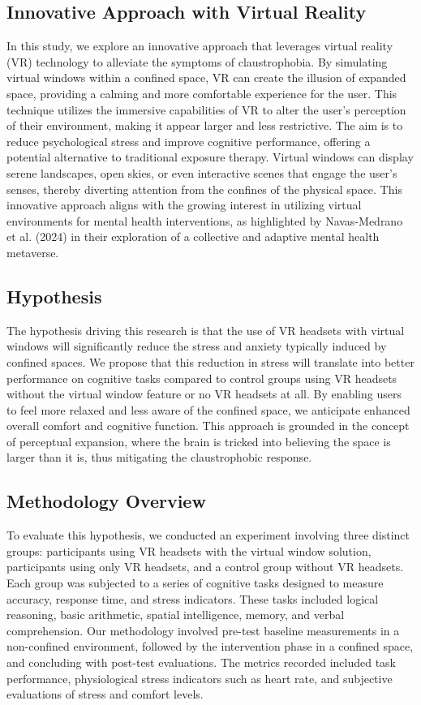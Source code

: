 \documentclass[runningheads]{llncs}
\begin{document}
\subsection{Innovative Approach with Virtual Reality}

In this study, we explore an innovative approach that leverages virtual reality (VR) technology to alleviate the symptoms of claustrophobia. By simulating virtual windows within a confined space, VR can create the illusion of expanded space, providing a calming and more comfortable experience for the user. This technique utilizes the immersive capabilities of VR to alter the user's perception of their environment, making it appear larger and less restrictive. The aim is to reduce psychological stress and improve cognitive performance, offering a potential alternative to traditional exposure therapy. Virtual windows can display serene landscapes, open skies, or even interactive scenes that engage the user's senses, thereby diverting attention from the confines of the physical space. This innovative approach aligns with the growing interest in utilizing virtual environments for mental health interventions, as highlighted by Navas-Medrano et al. (2024) in their exploration of a collective and adaptive mental health metaverse.

\subsection{Hypothesis}

The hypothesis driving this research is that the use of VR headsets with virtual windows will significantly reduce the stress and anxiety typically induced by confined spaces. We propose that this reduction in stress will translate into better performance on cognitive tasks compared to control groups using VR headsets without the virtual window feature or no VR headsets at all. By enabling users to feel more relaxed and less aware of the confined space, we anticipate enhanced overall comfort and cognitive function. This approach is grounded in the concept of perceptual expansion, where the brain is tricked into believing the space is larger than it is, thus mitigating the claustrophobic response.

\subsection{Methodology Overview}

To evaluate this hypothesis, we conducted an experiment involving three distinct groups: participants using VR headsets with the virtual window solution, participants using only VR headsets, and a control group without VR headsets. Each group was subjected to a series of cognitive tasks designed to measure accuracy, response time, and stress indicators. These tasks included logical reasoning, basic arithmetic, spatial intelligence, memory, and verbal comprehension. Our methodology involved pre-test baseline measurements in a non-confined environment, followed by the intervention phase in a confined space, and concluding with post-test evaluations. The metrics recorded included task performance, physiological stress indicators such as heart rate, and subjective evaluations of stress and comfort levels.
\end{document}
